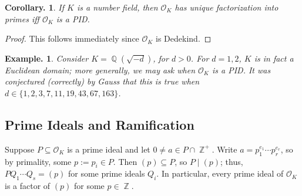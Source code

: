 \documentclass[11pt, a4paper]{memoir}
\DeclareMathOperator{\Q}{{\mathbb{Q}}}
\DeclareMathOperator{\Z}{{\mathbb{Z}}}
\theoremstyle{change}
\newtheorem{corollary}[theorem]{Corollary.}
\theoremstyle{plain}
\theoremstyle{nonumberplain}
\newtheorem{example}{Example.}
\newtheorem{proof}{Proof}
\numberwithin{equation}{section}
\begin{document}
\begin{corollary}
    If $K$ is a number field, then $\mathcal{O}_K$ has unique factorization into primes iff $\mathcal{O}_K$ is a PID.
\end{corollary}
\begin{proof}
    This follows immediately since $\mathcal{O}_K$ is Dedekind.
\end{proof}
\begin{example}
    Consider $K=\Q(\sqrt{-d})$, for $d>0$.
    For $d=1,2$, $K$ is in fact a Euclidean domain; more generally, we may ask when $\mathcal{O}_K$ is a PID.
    It was conjectured (correctly) by Gauss that this is true when $d\in\{1,2,3,7,11,19,43,67,163\}$.
\end{example}
\subsection{Prime Ideals and Ramification}
Suppose $P\subseteq\mathcal{O}_K$ is a prime ideal and let $0\neq a\in P\cap\Z^+$.
Write $a=p_1^{e_1}\cdots p_r^{e_r}$, so by primality, some $p:=p_i\in P$.
Then $(p)\subseteq P$, so $P\mid(p)$; thus, $PQ_1\cdots Q_s=(p)$ for some prime ideals $Q_i$.
In particular, every prime ideal of $\mathcal{O}_K$ is a factor of $(p)$ for some $p\in\Z$.
\end{document}
